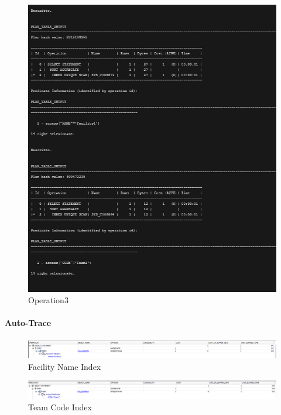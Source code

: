 \begin{figure}[H]
    \centering
    \includegraphics[width=\textwidth]{images/ExPlan3.png}
    \caption{Operation3}
\end{figure}

\paragraph{Auto-Trace} \leavevmode \newline

\begin{figure}[H]
    \centering
    \includegraphics[width=\textwidth]{images/FacilityName.png}
    \caption{Facility Name Index}
\end{figure}

\begin{figure}[H]
    \centering
    \includegraphics[width=\textwidth]{images/TeamCode.png}
    \caption{Team Code Index}
\end{figure}

